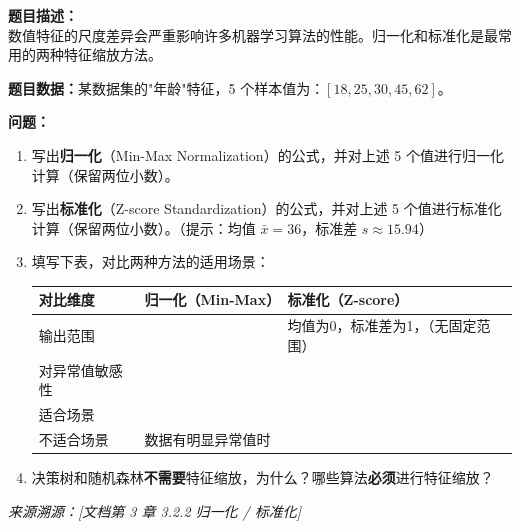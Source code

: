 \documentclass[a4paper,11pt]{ctexart}
\begin{document}
\begin{problembox}
    \textbf{题目描述：}\\
    数值特征的尺度差异会严重影响许多机器学习算法的性能。归一化和标准化是最常用的两种特征缩放方法。

    \vspace{0.3cm}
    \textbf{题目数据：}某数据集的"年龄"特征，5 个样本值为：$[18, 25, 30, 45, 62]$。

    \vspace{0.2cm}
    \textbf{问题：}
    \begin{enumerate}[(1)]
        \item 写出\textbf{归一化}（Min-Max Normalization）的公式，并对上述 5 个值进行归一化计算（保留两位小数）。

        \item 写出\textbf{标准化}（Z-score Standardization）的公式，并对上述 5 个值进行标准化计算（保留两位小数）。（提示：均值 $\bar{x} = 36$，标准差 $s \approx 15.94$）

        \item 填写下表，对比两种方法的适用场景：

        \begin{center}
        \begin{tabular}{p{2.5cm} p{4.5cm} p{4.5cm}}
            \toprule
            对比维度 & 归一化（Min-Max） & 标准化（Z-score） \\
            \midrule
            输出范围 & \underline{\hspace{4cm}} & 均值为0，标准差为1，\underline{\hspace{1cm}}（无固定范围） \\[1.2em]
            对异常值敏感性 & \underline{\hspace{4cm}} & \underline{\hspace{4cm}} \\[1.2em]
            适合场景 & \underline{\hspace{4cm}} & \underline{\hspace{4cm}} \\[1.2em]
            不适合场景 & 数据有明显异常值时 & \underline{\hspace{4cm}} \\
            \bottomrule
        \end{tabular}
        \end{center}

        \item 决策树和随机森林\textbf{不需要}特征缩放，为什么？哪些算法\textbf{必须}进行特征缩放？
    \end{enumerate}
    {\color{gray}\small\textit{来源溯源：[文档第 3 章 3.2.2 归一化 / 标准化]}}
\end{problembox}
\end{document}

